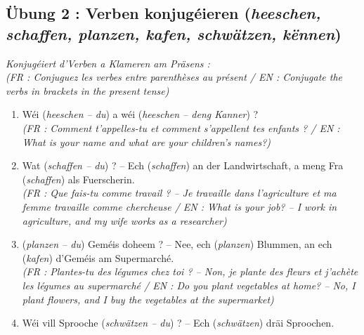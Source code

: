 \subsection*{Übung 2 : Verben konjugéieren (\textit{heeschen, schaffen, planzen, kafen, schwätzen, kënnen})}
\textit{Konjugéiert d'Verben a Klameren am Präsens :} \\
\textit{\small(FR : Conjuguez les verbes entre parenthèses au présent / EN : Conjugate the verbs in brackets in the present tense)}

\begin{enumerate}
    \item Wéi (\textit{heeschen -- du}) \underline{\hspace{2.5cm}} a wéi (\textit{heeschen -- deng Kanner}) \underline{\hspace{2.5cm}} ? \\
    \small\textit{(FR : Comment t'appelles-tu et comment s'appellent tes enfants ? / EN : What is your name and what are your children's names?)}
    \item Wat (\textit{schaffen -- du}) \underline{\hspace{2.5cm}} ? -- Ech (\textit{schaffen}) \underline{\hspace{2.5cm}} an der Landwirtschaft, a meng Fra (\textit{schaffen}) \underline{\hspace{2.5cm}} als Fuerscherin. \\
    \small\textit{(FR : Que fais-tu comme travail ? -- Je travaille dans l'agriculture et ma femme travaille comme chercheuse / EN : What is your job? -- I work in agriculture, and my wife works as a researcher)}
    \item (\textit{planzen -- du}) \underline{\hspace{2.5cm}} Geméis doheem ? -- Nee, ech (\textit{planzen}) \underline{\hspace{2.5cm}} Blummen, an ech (\textit{kafen}) \underline{\hspace{2.5cm}} d'Geméis am Supermarché. \\
    \small\textit{(FR : Plantes-tu des légumes chez toi ? -- Non, je plante des fleurs et j'achète les légumes au supermarché / EN : Do you plant vegetables at home? -- No, I plant flowers, and I buy the vegetables at the supermarket)}
    \item Wéi vill Sprooche (\textit{schwätzen -- du}) \underline{\hspace{2.5cm}} ? -- Ech (\textit{schwätzen}) \underline{\hspace{2.5cm}} dräi Sproochen. \\

\end{enumerate}

